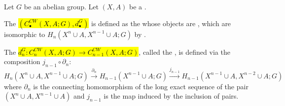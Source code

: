 \begin{definition} \label{definition:relative_absolute_cellular_chain_complex_of_CW_pair_complex}
Let $G$ be an abelian group. Let $(X, A)$ be a .  

The  \hl{$(C_{\bullet}^{CW}(X, A; G), d_{\bullet}^G)$} is defined as the  whose objects are , which are isomorphic to $H_n(X^n \cup A, X^{n-1} \cup A; G)$ by . 

The  \hl{$d_n^G: C_n^{CW}(X, A; G) \to C_{n-1}^{CW}(X, A; G)$}, called the , is defined via the composition $j_{n-1} \circ \partial_n$:
$$H_n(X^n \cup A, X^{n-1} \cup A; G) \xrightarrow{\partial_n} H_{n-1}(X^{n-1} \cup A; G) \xrightarrow{j_{n-1}} H_{n-1}(X^{n-1} \cup A, X^{n-2} \cup A; G)$$
where $\partial_n$ is the connecting homomorphism of the long exact sequence of the pair $(X^n \cup A, X^{n-1} \cup A)$ and $j_{n-1}$ is the map induced by the inclusion of pairs.
\end{definition}